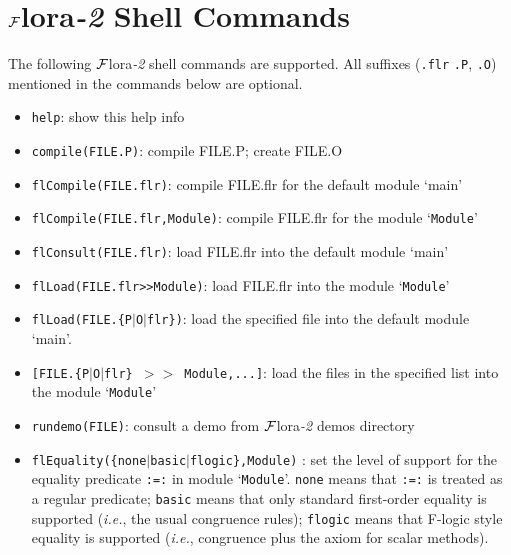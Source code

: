 \documentclass[11pt]{article}
\newcommand{\FLORA}{{\mbox{${\cal F}${\sc lora}\rm\emph{-2}}}\xspace}
\begin{document}
\section{\FLORA Shell Commands} \label{sec-shell-commands}

The following \FLORA shell commands are supported. All suffixes ({\tt .flr}
{\tt .P}, {\tt .O}) mentioned in the commands below are optional.
\begin{itemize}
\item {\tt help}:
    show this help info
\item {\tt compile(FILE.P)}:
    compile FILE.P; create FILE.O
\item {\tt flCompile(FILE.flr)}:
    compile FILE.flr for the default module `main'
\item {\tt flCompile(FILE.flr,Module)}:
    compile FILE.flr for the module `{\tt Module}'
\item {\tt flConsult(FILE.flr)}:
    load FILE.flr into the default module `main'
\item {\tt flLoad(FILE.flr>>Module)}:
    load FILE.flr into the module `{\tt Module}'
\item {\tt flLoad(FILE.\{P$|$O$|$flr\})}:
    load the specified file into the default module `main'.
\item {\tt [FILE.\{P$|$O$|$flr\} $>>$ Module,...]}:
    load the files in the specified list into the module `{\tt Module}'
\item {\tt rundemo(FILE)}:
    consult a demo from \FLORA demos directory
\item {\tt flEquality(\{none$|$basic$|$flogic\},Module)} :
    set the level of support for the equality predicate {\tt :=:} in module
    `{\tt Module}'. {\tt none}  means that {\tt :=:} is treated as a regular
    predicate; {\tt basic} means that only standard first-order equality is
    supported ({\it i.e.}, the usual congruence rules); {\tt flogic} means
    that F-logic style equality is supported ({\it i.e.}, congruence plus
    the axiom for scalar methods).


\end{itemize}
\end{document}
